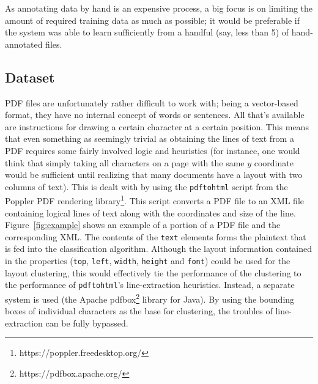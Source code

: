 As annotating data by hand is an expensive process, a big focus is on limiting
the amount of required training data as much as possible; it would be preferable
if the system was able to learn sufficiently from a handful (say, less than 5)
of hand-annotated files.

\subsection{Dataset}
PDF files are unfortunately rather difficult to work with; being a vector-based
format, they have no internal concept of words or sentences. All that's
available are instructions for drawing a certain character at a certain
position. This means that even something as seemingly trivial as obtaining the
lines of text from a PDF requires some fairly involved logic and heuristics (for
instance, one would think that simply taking all characters on a page with the
same $y$ coordinate would be sufficient until realizing that many documents have
a layout with two columns of text). This is dealt with by using the
\texttt{pdftohtml} script from the Poppler PDF rendering
library\footnote{https://poppler.freedesktop.org/}. This script converts a PDF
file to an XML file containing logical lines of text along with the coordinates
and size of the line. Figure~\ref{fig:example} shows an example of a portion of
a PDF file and the corresponding XML\@. The contents of the \texttt{text} elements
forms the plaintext that is fed into the classification algorithm. Although the
layout information contained in the properties (\texttt{top}, \texttt{left},
\texttt{width}, \texttt{height} and \texttt{font}) could be used for the layout
clustering, this would effectively tie the performance of the clustering to the
performance of \texttt{pdftohtml}'s line-extraction heuristics. Instead, a
separate system is used (the Apache pdfbox\footnote{https://pdfbox.apache.org/}
library for Java). By using the bounding boxes of individual characters as the
base for clustering, the troubles of line-extraction can be fully bypassed.

